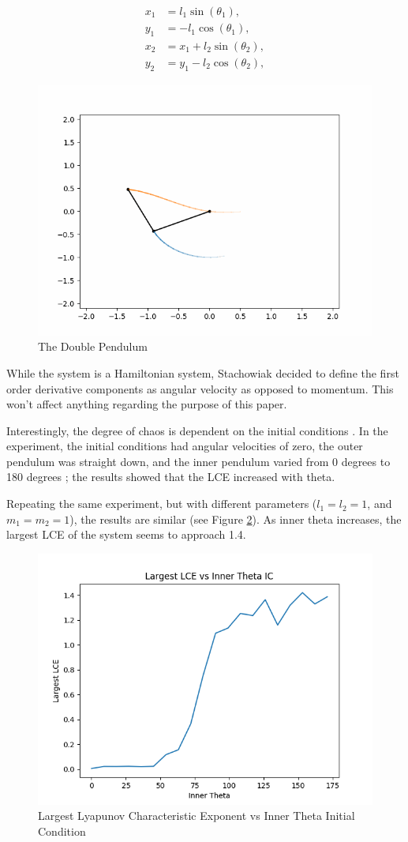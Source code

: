 \documentclass{article}
\begin{document}
\begin{align}
    x_1 &= l_1 \sin(\theta_1), \nonumber \\
    y_1 &= - l_1 \cos(\theta_1), \nonumber \\
    x_2 &= x_1 + l_2 \sin(\theta_2), \nonumber \\
    y_2 &= y_1 - l_2 \cos(\theta_2), \label{eq:doub_pend_endpoints}
\end{align}

\begin{figure}[H]
    \centering
    \includegraphics[width=.5\linewidth]{images/example_doub_pend.png}
    \caption{The Double Pendulum}
    \label{fig:doub_pend}
\end{figure}


While the system is a Hamiltonian system, Stachowiak decided to define the first order 
derivative components as angular velocity as opposed to momentum. This won't affect
anything regarding the purpose of this paper.

Interestingly, the 
degree of chaos is dependent on the initial conditions \cite{levien1993double}. 
In the experiment, the initial conditions had angular velocities of zero, the outer 
pendulum was straight down, and the inner pendulum varied from 0 degrees to 180 degrees 
\cite{levien1993double}; the results showed that the LCE increased with theta. 

Repeating the same experiment, but with different parameters ($l_1 = l_2 = 1$, and
$m_1 = m_2 = 1$), the results are similar (see Figure \ref{fig:doub_pend_energy}).
As inner theta increases, the largest LCE of the system seems to
approach 1.4. %

\begin{figure}[H]
    \centering
    \includegraphics[width=.5\linewidth]{images/chaos_vs_energy_in_doub_pend.png}
    \caption{Largest Lyapunov Characteristic Exponent vs Inner Theta Initial Condition}
    \label{fig:doub_pend_energy}
\end{figure}
\end{document}
